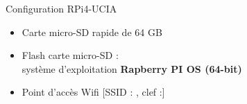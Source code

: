\documentclass[11pt,serif,mathserif,compress,hyperref={colorlinks}]{beamer}
\begin{document}
\begin{frame}{Configuration RPi4-UCIA}
  
  \begin{tcolorbox}[title={Configuration RPi4-UCIA}, height=68mm]
     \begin{itemize}
      \item<1-> Carte micro-SD rapide de 64 GB
      \item<2-> Flash carte micro-SD :\\système d'exploitation \textbf{Rapberry PI OS (64-bit)}\\
      \item<4-> Point d'accès Wifi [SSID : , clef :]\\

\end{itemize}
\end{tcolorbox}
\end{frame}
\end{document}
